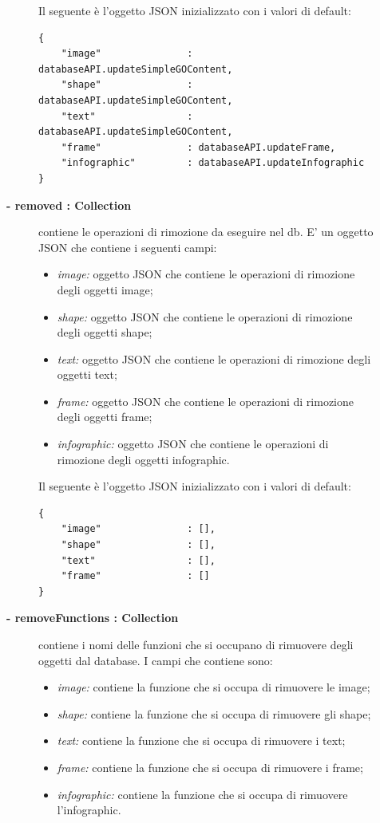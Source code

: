 \begin{description}
\begin{description}
Il seguente è l'oggetto JSON inizializzato con i valori di default:
			\begin{lstlisting}
{
    "image"               : databaseAPI.updateSimpleGOContent,
    "shape"               : databaseAPI.updateSimpleGOContent,
    "text"                : databaseAPI.updateSimpleGOContent,
    "frame"               : databaseAPI.updateFrame,
    "infographic"         : databaseAPI.updateInfographic   
}
			\end{lstlisting}				
					
	\item[\textbf{- removed : Collection			}] \hfill
			contiene le operazioni di rimozione da eseguire nel db. E' un oggetto JSON che contiene i seguenti campi:
			\begin{itemize}
				\item \textit{image:} oggetto JSON che contiene le operazioni di rimozione degli oggetti image;
				\item \textit{shape:} oggetto JSON che contiene le operazioni di rimozione degli oggetti shape;
				\item \textit{text:} oggetto JSON che contiene le operazioni di rimozione degli oggetti text;
				\item \textit{frame:} oggetto JSON che contiene le operazioni di rimozione degli oggetti frame;
				\item \textit{infographic:} oggetto JSON che contiene le operazioni di rimozione degli oggetti infographic.
			\end{itemize}
			
			Il seguente è l'oggetto JSON inizializzato con i valori di default:
			\begin{lstlisting}
{
    "image"               : [],
    "shape"               : [],
    "text"                : [],
    "frame"               : [] 
}
			\end{lstlisting}					
	\item[\textbf{- removeFunctions : Collection			}] \hfill
			contiene i nomi delle funzioni che si occupano di rimuovere degli oggetti dal database. I campi che contiene sono:
			\begin{itemize}
				\item \textit{image:} contiene la funzione che si occupa di rimuovere le image;
				\item \textit{shape:} contiene la funzione che si occupa di rimuovere gli shape;
				\item \textit{text:} contiene la funzione che si occupa di rimuovere i text;
				\item \textit{frame:} contiene la funzione che si occupa di rimuovere i frame;
				\item \textit{infographic:} contiene la funzione che si occupa di rimuovere l'infographic.
			\end{itemize}
			

\end{description}
\end{description}
